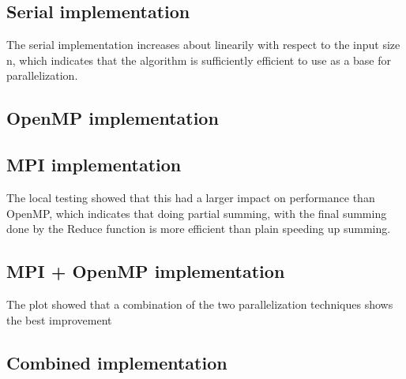 \documentclass[fontsize=11pt,paper=a4,titlepage]{report}
\begin{document}
\subsection{Serial implementation}
The serial implementation increases about linearily with respect to the input size n, which indicates that
the algorithm is sufficiently efficient to use as a base for parallelization.

\subsection{OpenMP implementation}

\subsection{MPI implementation}
The local testing showed that this had a larger impact on performance than OpenMP, which indicates that doing partial summing, with the final summing done by the Reduce function is more efficient than plain speeding up summing.

\subsection{MPI + OpenMP implementation}
The plot showed that a combination of the two parallelization techniques shows the best improvement

\subsection{Combined implementation}
\end{document}
